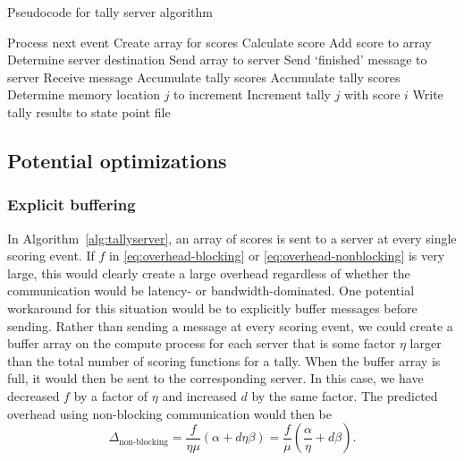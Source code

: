 \documentclass[3p,fleqn]{elsarticle}
\begin{document}
\begin{algorithm}
  \caption{Pseudocode for tally server algorithm}
  \label{alg:tallyserver}
  \begin{algorithmic}
            \State Process next event
              \State Create array for scores
                \State Calculate score
                \State Add score to array
              \EndFor
              \State Determine server destination
              \State Send array to server
            \EndIf
          \EndWhile
        \EndFor
        \State Send `finished' message to server
      \EndFor
      \Loop
        \State Receive message
          \State Accumulate tally scores
          \State Accumulate tally scores
        \Else
          \State Determine memory location $j$ to increment
          \State Increment tally $j$ with score $i$
          \EndFor
        \EndIf
      \EndLoop
      \State Write tally results to state point file
    \EndIf
  \end{algorithmic}
\end{algorithm}

\subsection{Potential optimizations}

\subsubsection{Explicit buffering}

In Algorithm~\ref{alg:tallyserver}, an array of scores is sent to a server at
every single scoring event. If $f$ in \eqref{eq:overhead-blocking} or
\eqref{eq:overhead-nonblocking} is very large, this would clearly create a large
overhead regardless of whether the communication would be latency- or
bandwidth-dominated. One potential workaround for this situation would be to
explicitly buffer messages before sending. Rather than sending a message at
every scoring event, we could create a buffer array on the compute process for
each server that is some factor $\eta$ larger than the total number of scoring
functions for a tally. When the buffer array is full, it would then be sent to
the corresponding server. In this case, we have decreased $f$ by a factor of
$\eta$ and increased $d$ by the same factor. The predicted overhead using
non-blocking communication would then be
\begin{equation}
  \label{eq:overhead-nonblocking-buffer}
  \Delta_{\text{non-blocking}} = \frac{f}{\eta\mu} \left ( \alpha + d\eta\beta
  \right ) = \frac{f}{\mu} \left ( \frac{\alpha}{\eta} + d\beta \right ).
\end{equation}
\end{document}
